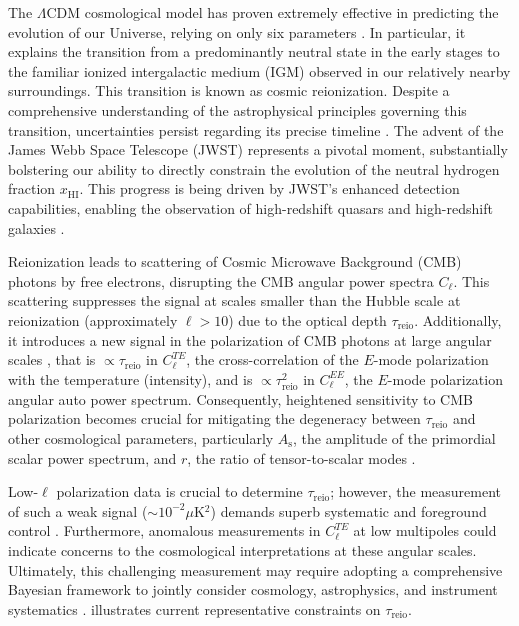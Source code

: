 \documentclass[12pt, a4paper]{article}
\newcommand{\As}{A_\mathrm{s}}
\newcommand{\HI}{\mathrm{HI}}
\newcommand{\reio}{\mathrm{reio}}
\begin{document}
\newpage



The $\Lambda$CDM cosmological model has proven extremely effective in
predicting the evolution of our Universe, relying on only six parameters
\cite{Planck2020a}.
In particular, it explains the transition from a predominantly neutral
state in the early stages to the familiar ionized intergalactic medium
(IGM) observed in our relatively nearby surroundings.
This transition is known as cosmic reionization.
Despite a comprehensive understanding of the astrophysical principles
governing this transition, uncertainties persist regarding its precise
timeline \cite{Jin2023}.
The advent of the James Webb Space Telescope (JWST) \cite{Gardner2006}
represents a pivotal moment, substantially bolstering our ability to
directly constrain the evolution of the neutral hydrogen fraction
$x_\HI$.
This progress is being driven by JWST's enhanced detection capabilities,
enabling the observation of high-redshift quasars \cite{Eilers2023} and
high-redshift galaxies \cite{Adams2023, Bradley2023, Donnan2023,
Ning2024}.

Reionization leads to scattering of Cosmic Microwave Background (CMB)
photons by free electrons, disrupting the CMB angular power spectra
$C_\ell$.
This scattering suppresses the signal at scales smaller than the Hubble
scale at reionization (approximately $\ell>10$) \cite{Planck2020b} due
to the optical depth $\tau_\reio$.
Additionally, it introduces a new signal in the polarization of CMB
photons at large angular scales \cite{Planck2020a}, that is $\propto
\tau_\reio$ in $C^{TE}_\ell$, the cross-correlation of the $E$-mode
polarization with the temperature (intensity), and is $\propto
\tau_\reio^2$ in $C^{EE}_\ell$, the $E$-mode polarization angular auto
power spectrum.
Consequently, heightened sensitivity to CMB polarization becomes crucial
for mitigating the degeneracy between $\tau_\reio$ and other
cosmological parameters, particularly $\As$, the amplitude of the
primordial scalar power spectrum, and $r$, the ratio of tensor-to-scalar
modes \cite{Natale2020}.

Low-$\ell$ polarization data is crucial to determine $\tau_\reio$;
however, the measurement of such a weak signal ($\sim 10^{-2} \mu$K$^2$)
demands superb systematic and foreground control \cite{Planck2020b}.
Furthermore, anomalous measurements in $C^{TE}_\ell$ at low multipoles
\cite{Planck2020a} could indicate concerns to the cosmological
interpretations at these angular scales.
Ultimately, this challenging measurement may require adopting a
comprehensive Bayesian framework to jointly consider cosmology,
astrophysics, and instrument systematics \cite{Paradiso2023}.
 illustrates current representative constraints on
$\tau_\reio$.
\end{document}
